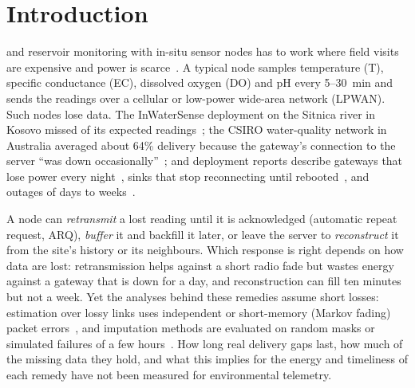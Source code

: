 \section{Introduction}
\label{sec:intro}

 and reservoir monitoring with in-situ sensor nodes has to work where field visits are expensive and power is scarce~\cite{adumanu2017survey,adumanu2020smart}. A typical node samples temperature (T), specific conductance (EC), dissolved oxygen (DO) and pH every 5--30~min and sends the readings over a cellular or low-power wide-area network (LPWAN). Such nodes lose data. The InWaterSense deployment on the Sitnica river in Kosovo missed \inwsLoss{} of its expected readings~\cite{ahmedi2022dataset}; the CSIRO water-quality network in Australia averaged about 64\% delivery because the gateway's connection to the server ``was down occasionally''~\cite{ledinh2007design}; and deployment reports describe gateways that lose power every night~\cite{langendoen2006murphy}, sinks that stop reconnecting until rebooted~\cite{ingelrest2010sensorscope,brzozowski2018lessons}, and outages of days to weeks~\cite{puluckul2025subarctic,zennaro2025kyrgyzstan}.

A node can \emph{retransmit} a lost reading until it is acknowledged (automatic repeat request, ARQ), \emph{buffer} it and backfill it later, or leave the server to \emph{reconstruct} it from the site's history or its neighbours. Which response is right depends on how data are lost: retransmission helps against a short radio fade but wastes energy against a gateway that is down for a day, and reconstruction can fill ten minutes but not a week. Yet the analyses behind these remedies assume short losses: estimation over lossy links uses independent or short-memory (Markov fading) packet errors~\cite{sinopoli2004kalman,huang2019retransmit,huang2020harq}, and imputation methods are evaluated on random masks or simulated failures of a few hours~\cite{kong2014dataloss,cini2022grin,marisca2022spin,chang2023deepcs}. How long real delivery gaps last, how much of the missing data they hold, and what this implies for the energy and timeliness of each remedy have not been measured for environmental telemetry.

